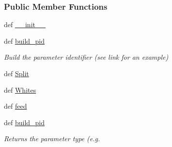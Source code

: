 \subsubsection*{Public Member Functions}
\begin{DoxyCompactItemize}
\item 
def \hyperlink{classforcebalance_1_1openmmio_1_1OpenMM__Reader_a111f672a2f7b835da774dc5e6f265731}{\-\_\-\-\_\-init\-\_\-\-\_\-}
\item 
def \hyperlink{classforcebalance_1_1openmmio_1_1OpenMM__Reader_ac89322d09d53425b5151f39306f4b38b}{build\-\_\-pid}
\begin{DoxyCompactList}\small\item\em Build the parameter identifier (see {\itshape link} for an example) \end{DoxyCompactList}\item 
def \hyperlink{classforcebalance_1_1basereader_1_1BaseReader_ae0ea53a7d942ceb93bdc34499f694639}{Split}
\item 
def \hyperlink{classforcebalance_1_1basereader_1_1BaseReader_a2819ab1e523b6ff8e7467e56e3582386}{Whites}
\item 
def \hyperlink{classforcebalance_1_1basereader_1_1BaseReader_ad345848c6683d9ba66eed0d2b0197fb6}{feed}
\item 
def \hyperlink{classforcebalance_1_1basereader_1_1BaseReader_a208a252b78a079e81a4a0b5320f3d564}{build\-\_\-pid}
\begin{DoxyCompactList}\small\item\em Returns the parameter type (e.\-g. \end{DoxyCompactList}\end{DoxyCompactItemize}

